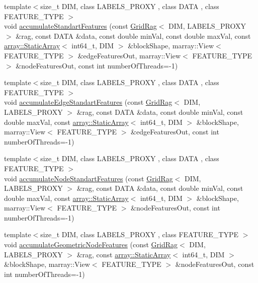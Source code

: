 \begin{DoxyCompactItemize}
{\footnotesize template$<$size\+\_\+t D\+I\+M, class L\+A\+B\+E\+L\+S\+\_\+\+P\+R\+O\+X\+Y , class D\+A\+T\+A , class F\+E\+A\+T\+U\+R\+E\+\_\+\+T\+Y\+P\+E $>$ }\\void \hyperlink{namespacenifty_1_1graph_a42c0895aee417f8a18d643aad2591c8b}{accumulate\+Standart\+Features} (const \hyperlink{classnifty_1_1graph_1_1GridRag}{Grid\+Rag}$<$ D\+I\+M, L\+A\+B\+E\+L\+S\+\_\+\+P\+R\+O\+X\+Y $>$ \&rag, const D\+A\+T\+A \&data, const double min\+Val, const double max\+Val, const \hyperlink{namespacenifty_1_1array_a683f151f19c851754e0c6d55ed16a0c2}{array\+::\+Static\+Array}$<$ int64\+\_\+t, D\+I\+M $>$ \&block\+Shape, marray\+::\+View$<$ F\+E\+A\+T\+U\+R\+E\+\_\+\+T\+Y\+P\+E $>$ \&edge\+Features\+Out, marray\+::\+View$<$ F\+E\+A\+T\+U\+R\+E\+\_\+\+T\+Y\+P\+E $>$ \&node\+Features\+Out, const int number\+Of\+Threads=-\/1)
\item 
{\footnotesize template$<$size\+\_\+t D\+I\+M, class L\+A\+B\+E\+L\+S\+\_\+\+P\+R\+O\+X\+Y , class D\+A\+T\+A , class F\+E\+A\+T\+U\+R\+E\+\_\+\+T\+Y\+P\+E $>$ }\\void \hyperlink{namespacenifty_1_1graph_a418009772088e19eb7c14b46e6a01eb5}{accumulate\+Edge\+Standart\+Features} (const \hyperlink{classnifty_1_1graph_1_1GridRag}{Grid\+Rag}$<$ D\+I\+M, L\+A\+B\+E\+L\+S\+\_\+\+P\+R\+O\+X\+Y $>$ \&rag, const D\+A\+T\+A \&data, const double min\+Val, const double max\+Val, const \hyperlink{namespacenifty_1_1array_a683f151f19c851754e0c6d55ed16a0c2}{array\+::\+Static\+Array}$<$ int64\+\_\+t, D\+I\+M $>$ \&block\+Shape, marray\+::\+View$<$ F\+E\+A\+T\+U\+R\+E\+\_\+\+T\+Y\+P\+E $>$ \&edge\+Features\+Out, const int number\+Of\+Threads=-\/1)
\item 
{\footnotesize template$<$size\+\_\+t D\+I\+M, class L\+A\+B\+E\+L\+S\+\_\+\+P\+R\+O\+X\+Y , class D\+A\+T\+A , class F\+E\+A\+T\+U\+R\+E\+\_\+\+T\+Y\+P\+E $>$ }\\void \hyperlink{namespacenifty_1_1graph_ad7d29a3cfced104a7af73df235b91238}{accumulate\+Node\+Standart\+Features} (const \hyperlink{classnifty_1_1graph_1_1GridRag}{Grid\+Rag}$<$ D\+I\+M, L\+A\+B\+E\+L\+S\+\_\+\+P\+R\+O\+X\+Y $>$ \&rag, const D\+A\+T\+A \&data, const double min\+Val, const double max\+Val, const \hyperlink{namespacenifty_1_1array_a683f151f19c851754e0c6d55ed16a0c2}{array\+::\+Static\+Array}$<$ int64\+\_\+t, D\+I\+M $>$ \&block\+Shape, marray\+::\+View$<$ F\+E\+A\+T\+U\+R\+E\+\_\+\+T\+Y\+P\+E $>$ \&node\+Features\+Out, const int number\+Of\+Threads=-\/1)
\item 
{\footnotesize template$<$size\+\_\+t D\+I\+M, class L\+A\+B\+E\+L\+S\+\_\+\+P\+R\+O\+X\+Y , class F\+E\+A\+T\+U\+R\+E\+\_\+\+T\+Y\+P\+E $>$ }\\void \hyperlink{namespacenifty_1_1graph_a11bcf8795f57d9e5200fa52c1fb3a883}{accumulate\+Geometric\+Node\+Features} (const \hyperlink{classnifty_1_1graph_1_1GridRag}{Grid\+Rag}$<$ D\+I\+M, L\+A\+B\+E\+L\+S\+\_\+\+P\+R\+O\+X\+Y $>$ \&rag, const \hyperlink{namespacenifty_1_1array_a683f151f19c851754e0c6d55ed16a0c2}{array\+::\+Static\+Array}$<$ int64\+\_\+t, D\+I\+M $>$ \&block\+Shape, marray\+::\+View$<$ F\+E\+A\+T\+U\+R\+E\+\_\+\+T\+Y\+P\+E $>$ \&node\+Features\+Out, const int number\+Of\+Threads=-\/1)

\end{DoxyCompactItemize}
